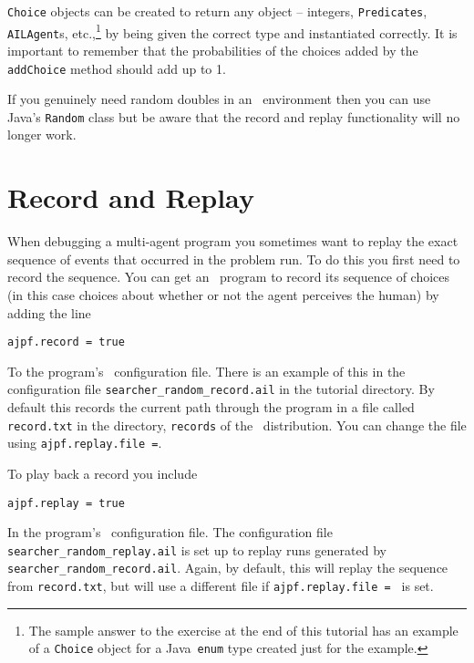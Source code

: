 \texttt{Choice} objects can be created to return any object -- integers, \texttt{Predicates}, \texttt{AILAgent}s, etc.,\footnote{The sample answer to the exercise at the end of this tutorial has an example of a \texttt{Choice} object for a Java\ \texttt{enum} type created just for the example.} by being given the correct type and instantiated correctly.  It is important to remember that the probabilities of the choices added by the \texttt{addChoice} method should add up to 1.

If you genuinely need random doubles in an \ail\ environment then you can use Java's \texttt{Random} class but be aware that the record and replay functionality will no longer work.

\section{Record and Replay}
When debugging a multi-agent program you sometimes want to replay the exact sequence of events that occurred in the  problem run.  To do this you first need to record the sequence.  You can get an \ail\ program to record its sequence of choices (in this case choices about whether or not the agent perceives the human) by adding the line

\begin{verbatim}
ajpf.record = true
\end{verbatim}

\begin{sloppypar}
To the program's \ail\ configuration file.  There is an example of this in the configuration file \texttt{searcher\_random\_record.ail} in the tutorial directory.  By default this records the current path through the program in a file called \texttt{record.txt} in the directory, \texttt{records} of the \mcapl\ distribution.  You can change the file using \texttt{ajpf.replay.file =}.  
\end{sloppypar}

To play back a record you include
\begin{verbatim}
ajpf.replay = true
\end{verbatim}
\begin{sloppypar}
In the program's \ail\ configuration file.  The configuration file \texttt{searcher\_random\_replay.ail} is set up to replay runs generated by \texttt{searcher\_random\_record.ail}.  Again, by default, this will replay the sequence from \texttt{record.txt}, but will use a different file if \texttt{ajpf.replay.file = } is set.  
\end{sloppypar}

